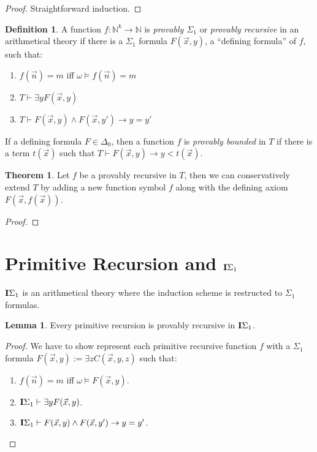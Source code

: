 \documentclass[8pt]{article}
\theoremstyle{definition}
\newtheorem{definition}{Definition}[section]
\theoremstyle{definition}
\newtheorem{theorem}{Theorem}[section]
\theoremstyle{definition}
\theoremstyle{definition}
\theoremstyle{definition}
\theoremstyle{definition}
\theoremstyle{definition}
\theoremstyle{definition}
\newtheorem{lemma}{Lemma}[section]
\theoremstyle{definition}
\theoremstyle{definition}
\theoremstyle{definition}
\theoremstyle{definition}
\theoremstyle{definition}
\theoremstyle{question}
\begin{document}
\begin{proof}
  Straightforward induction.
\end{proof}

\begin{definition}
  A function $f : \mathbb{N}^k \to \mathbb{N}$ is \emph{provably $\Sigma_1$} or \emph{provably recursive}
  in an arithmetical theory if there is a $\Sigma_1$ formula $F(\vec{x}, y)$, a ``defining formula'' of $f$, such that:
  \begin{enumerate}
    \item $f(\vec{n}) = m$ iff $\omega \models f(\vec{n}) = m$
    \item $T \vdash \exists y F(\vec{x}, y)$
    \item $T \vdash F(\vec{x}, y) \land F(\vec{x}, y') \to y = y'$
  \end{enumerate}
\end{definition}
If a defining formula $F \in \Delta_0$, then a function $f$ is \emph{provably bounded} 
in $T$ if there is a term $t(\vec{x})$ such that $T \vdash F(\vec{x}, y) \to y < t(\vec{x})$.

\begin{theorem}
  Let $f$ be a provably recursive in $T$, then we can conservatively extend $T$
  by adding a new function symbol $f$ along with the defining axiom $F(\vec{x}, f(\vec{x}))$.
\end{theorem}

\begin{proof}
  
\end{proof}

\section{Primitive Recursion and ${\bf I}\Sigma_1$}

${\bf I}\Sigma_1$ is an arithmetical theory where the induction scheme is
restructed to $\Sigma_1$ formulas.

\begin{lemma}
  Every primitive recursion is provably recursive in ${\bf I}\Sigma_1$.
\end{lemma}

\begin{proof}
  We have to show represent each primitive recursive function $f$ with a $\Sigma_1$ formula 
  $F(\vec{x}, y) := \exists z C(\vec{x}, y, z)$ such that:
  \begin{enumerate}
    \item $f(\vec{n}) = m$ iff $\omega \models F(\vec{x}, y)$.
    \item ${\bf I}\Sigma_1 \vdash \exists y F(\vec{x}, y)$.
    \item ${\bf I}\Sigma_1 \vdash F(\vec{x}, y) \land F(\vec{x}, y') \to y = y'$.
  \end{enumerate}


\end{proof}




\end{document}
